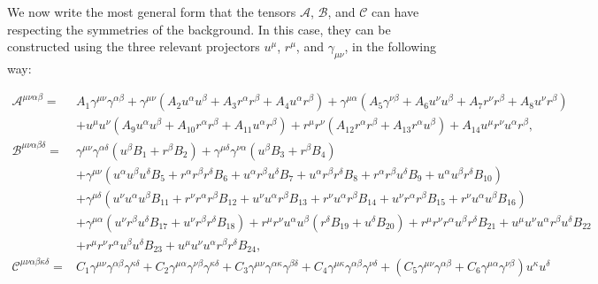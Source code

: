 \documentclass[10pt,twocolumn,preprintnumbers,amsmath,amssymb,nofootinbib
,superscriptaddress]{revtex4-1}
\begin{document}
We now write the most general form that the tensors $\mathcal{A}$, $\mathcal{B}$, and $\mathcal{C}$ can have respecting the symmetries of the background. In this case, they can be constructed using the three relevant projectors $u^\mu$, $r^\mu$, and $\gamma_{\mu\nu}$, in the following way:
\begin{widetext}
\begin{align}
\mathcal{A}^{\mu\nu\alpha\beta}= &A_1 \gamma^{\mu\nu} \gamma^{\alpha\beta}+\gamma^{\mu\nu} \left(A_2
 u^\alpha u^\beta+A_3 r^\alpha r^\beta+A_4 u^\alpha r^\beta\right)+\gamma^{\mu\alpha} \left(A_5 \gamma^{\nu\beta}+A_6 u^\nu u^\beta+A_7 r^\nu r^\beta+A_8
 u^\nu r^\beta\right)\nonumber\\
 &+u^\mu u^\nu \left(A_9 u^\alpha u^\beta+A_{10}
 r^\alpha r^\beta+A_{11} u^\alpha r^\beta\right)+r^\mu r^\nu \left(A_{12} r^\alpha r^\beta+A_{13} r^\alpha u^\beta\right)+A_{14}u^\mu r^\nu
 u^\alpha r^\beta\label{Atensor},\\
\mathcal{B}^{\mu\nu\alpha\beta\delta}=&\gamma^{\mu\nu}
 \gamma^{\alpha\delta} \left(u^\beta B_1+r^\beta B_2\right)+\gamma^{\mu\delta} \gamma^{\nu\alpha} \left(u^\beta B_3+r^\beta B_4\right)\nonumber\\
 &+\gamma^{\mu\nu}\left(u^\alpha u^\beta u^\delta
 B_5+r^\alpha r^\beta r^\delta B_6+u^\alpha r^\beta u^\delta B_7+u^\alpha r^\beta r^\delta B_8+r^\alpha r^\beta u^\delta B_9+u^\alpha
 u^\beta r^\delta B_{10}\right)\nonumber\\
 &+\gamma^{\mu\delta} \left(u^\nu u^\alpha u^\beta B_{11}+r^\nu r^\alpha r^\beta
 B_{12}+u^\nu u^\alpha r^\beta B_{13}+r^\nu u^\alpha r^\beta B_{14}+u^\nu
 r^\alpha r^\beta B_{15}+r^\nu u^\alpha u^\beta
 B_{16}\right)\nonumber\\
 &+\gamma^{\mu\alpha} \left(u^\nu r^\beta u^\delta
 B_{17}+u^\nu r^\beta r^\delta B_{18}\right)+r^\mu r^\nu u^\alpha u^\beta \left(r^\delta B_{19}+u^\delta
 B_{20}\right)+r^\mu r^\nu r^\alpha u^\beta r^\delta B_{21}+u^\mu u^\nu u^\alpha r^\beta u^\delta
 B_{22}\nonumber\\
 &+r^\mu r^\nu r^\alpha u^\beta u^\delta
 B_{23}+u^\mu u^\nu u^\alpha r^\beta r^\delta B_{24}\label{Btensor},\\
\mathcal{C}^{\mu\nu\alpha\beta\kappa\delta}=&C_1\gamma^{\mu\nu}\gamma^{\alpha\beta}\gamma^{\kappa\delta}+ C_2\gamma^{\mu\alpha}\gamma^{\nu\beta}\gamma^{\kappa\delta}+ C_3\gamma^{\mu\nu}\gamma^{\alpha\kappa}\gamma^{\beta\delta}+ C_4\gamma^{\mu\kappa}\gamma^{\alpha\beta}\gamma^{\nu\delta}
 +\left(C_5 \gamma^{\mu\nu}\gamma^{\alpha\beta}+ C_6\gamma^{\mu\alpha}\gamma^{\nu\beta}\right)u^\kappa u^\delta \nonumber\\

\end{align}
\end{widetext}
\end{document}
